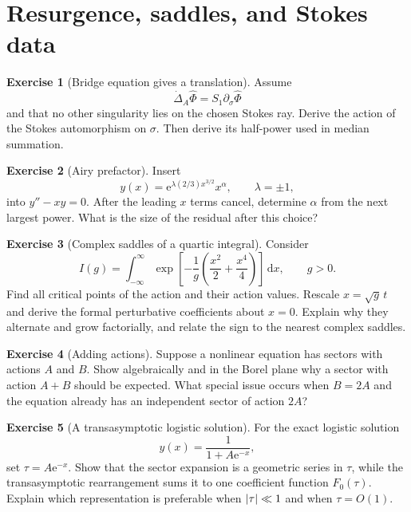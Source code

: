\documentclass[11pt,oneside]{book}
\theoremstyle{definition}
\newtheorem{exercise}{Exercise}[chapter]
\theoremstyle{remark}
\newcommand{\e}{\mathrm{e}}
\newcommand{\dd}{\,\mathrm{d}}
\DeclarePairedDelimiter{\abs}{\lvert}{\rvert}
\begin{document}
\section{Resurgence, saddles, and Stokes data}

\begin{exercise}[Bridge equation gives a translation]
\label{ex:bridge-translation}
Assume
\[
  \dot\Delta_A\widehat\Phi=S_1\partial_\sigma\widehat\Phi
\]
and that no other singularity lies on the chosen Stokes ray. Derive the action
of the Stokes automorphism on $\sigma$. Then derive its half-power used in median
summation.
\end{exercise}

\begin{exercise}[Airy prefactor]
\label{ex:airy-prefactor}
Insert
\[
  y(x)=\e^{\lambda(2/3)x^{3/2}}x^\alpha,
  \qquad\lambda=\pm1,
\]
into $y''-xy=0$. After the leading $x$ terms cancel, determine $\alpha$ from the
next largest power. What is the size of the residual after this choice?
\end{exercise}

\begin{exercise}[Complex saddles of a quartic integral]
\label{ex:quartic-saddles}
Consider
\[
  I(g)=\int_{-\infty}^{\infty}
  \exp\!\left[-\frac1g
    \left(\frac{x^2}{2}+\frac{x^4}{4}\right)
  \right]\dd x,
  \qquad g>0.
\]
Find all critical points of the action and their action values. Rescale
$x=\sqrt g\,t$ and derive the formal perturbative coefficients about $x=0$.
Explain why they alternate and grow factorially, and relate the sign to the
nearest complex saddles.
\end{exercise}

\begin{exercise}[Adding actions]
\label{ex:adding-actions}
Suppose a nonlinear equation has sectors with actions $A$ and $B$. Show
algebraically and in the Borel plane why a sector with action $A+B$ should be
expected. What special issue occurs when $B=2A$ and the equation already has an
independent sector of action $2A$?
\end{exercise}

\begin{exercise}[A transasymptotic logistic solution]
\label{ex:logistic-transasymptotic}
For the exact logistic solution
\[
  y(x)=\frac1{1+A\e^{-x}},
\]
set $\tau=A\e^{-x}$. Show that the sector expansion is a geometric series in
$\tau$, while the transasymptotic rearrangement sums it to one coefficient
function $F_0(\tau)$. Explain which representation is preferable when
$\abs\tau\ll1$ and when $\tau=O(1)$.
\end{exercise}
\end{document}
